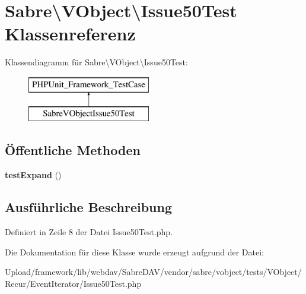 \hypertarget{class_sabre_1_1_v_object_1_1_issue50_test}{}\section{Sabre\textbackslash{}V\+Object\textbackslash{}Issue50\+Test Klassenreferenz}
\label{class_sabre_1_1_v_object_1_1_issue50_test}
Klassendiagramm für Sabre\textbackslash{}V\+Object\textbackslash{}Issue50\+Test\+:\begin{figure}[H]
\begin{center}
\leavevmode
\includegraphics[height=2.000000cm]{class_sabre_1_1_v_object_1_1_issue50_test}
\end{center}
\end{figure}
\subsection*{Öffentliche Methoden}
\begin{DoxyCompactItemize}
\item 
\mbox{\label{class_sabre_1_1_v_object_1_1_issue50_test_a41728f84a69917a2b2a0c59d739b0349}} 
{\bfseries test\+Expand} ()
\end{DoxyCompactItemize}


\subsection{Ausführliche Beschreibung}


Definiert in Zeile 8 der Datei Issue50\+Test.\+php.



Die Dokumentation für diese Klasse wurde erzeugt aufgrund der Datei\+:\begin{DoxyCompactItemize}
\item 
Upload/framework/lib/webdav/\+Sabre\+D\+A\+V/vendor/sabre/vobject/tests/\+V\+Object/\+Recur/\+Event\+Iterator/Issue50\+Test.\+php\end{DoxyCompactItemize}
